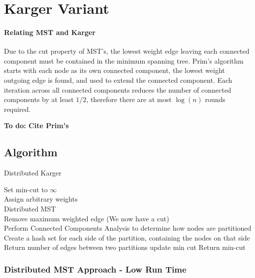 \documentclass[12pt]{article}
\begin{document}
\section{Karger Variant}

\paragraph{Relating MST and Karger}
Due to the cut property of MST's, the lowest weight edge leaving each connected component must be contained in the minimum spanning tree. Prim's algorithm starts with each node as its own connected component, the lowest weight outgoing edge is found, and used to extend the connected component. Each iteration across all connected components reduces the number of connected components by at least $1/2$, therefore there are at most $\log(n)$ rounds required. 

\textbf{To do: Cite Prim's}

\subsection{Algorithm}

\LinesNumbered
\begin{algorithm}[H]
\caption{Distributed Karger}
Set min-cut to $\infty$ \\
 {
  Assign arbitrary weights \\
  Distributed MST \\
  Remove maximum weighted edge (We now have a cut) \\
  Perform Connected Components Analysis to determine how nodes are partitioned \\
  Create a hash set for each side of the partition, containing the nodes on that side \\
  \Reduce{} {
    Return number of edges between two partitions
  }
   {
    update min cut
  }
}
Return min-cut
\end{algorithm}

\subsubsection{Distributed MST Approach - Low Run Time}
\end{document}
